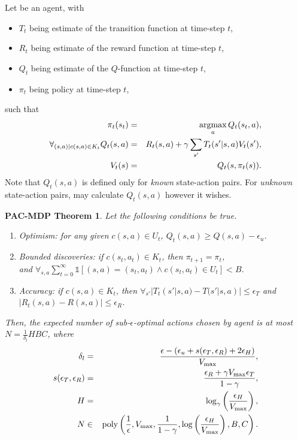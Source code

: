 \begin{defn}
Let \A be an agent, with
\begin{itemize}
\item
$T_t$ being \As estimate of the transition function at time-step $t$,
\item
$R_t$ being \As estimate of the reward function at time-step $t$,
\item
$Q_t$ being \As estimate of the $Q$-function at time-step $t$,
\item
$\pi_t$ being \As policy at time-step $t$, 
\end{itemize}
such that
\begin{eqnarray}
\pi_t(s_t) &=& \argmax_a Q_t(s_t,a),\\
\forall_{(s,a) | c(s,a)\in K_t} Q_t(s,a) &=& R_t(s,a) + \gamma \sum_{s'} T_t(s'|s,a) V_t(s'),\\
V_t(s) &=& Q_t(s,\pi_t(s)).
\end{eqnarray}
Note that $Q_t(s,a)$ is defined only for \emph{known} state-action pairs. For \emph{unknown} state-action pairs, \A may calculate $Q_t(s,a)$ however it wishes.
\end{defn}

\newtheorem*{pacmdpthm}{PAC-MDP Theorem}
\begin{pacmdpthm}
Let the following conditions be true.
\begin{enumerate}
\item
\label{sec:pacmdp:cond:opt}
Optimism: for any given $c(s,a) \in U_t$, $Q_t(s,a) \geq Q(s,a) - \epsilon_u$.
\item
\label{sec:pacmdp:cond:bounded}
Bounded discoveries: if $c(s_t, a_t) \in K_t$, then $\pi_{t+1} = \pi_{t}$,\\ and $\forall_{s,a} \sum_{t=0}^\infty \mathbb{1}\left[(s,a) = (s_t,a_t) \wedge c(s_t,a_t) \in U_t\right] < B$.
\item
\label{sec:pacmdp:cond:acc}
Accuracy: if $c(s,a) \in K_t$, then $\forall_{s'}|T_t(s'|s,a)-T(s'|s,a)| \leq \epsilon_T$ and $|R_t(s,a)-R(s,a)|\leq\epsilon_R$.
\end{enumerate}
Then, the expected number of sub-$\epsilon$-optimal actions chosen by agent \A is at most $N = \frac 1 {\delta_l} H B C$, where
\begin{eqnarray}
\delta_l &=& \frac {\epsilon - (\epsilon_u + s(\epsilon_T,\epsilon_R) +2 \epsilon_H)} {V_{\rm max}},\\
s(\epsilon_T,\epsilon_R) &=& \frac {\epsilon_R + \gamma V_{\rm max} \epsilon_T} {1-\gamma},\\
H&=&\log_\gamma\left(\frac {\epsilon_H}{V_{\rm max}}\right),\\
N&\in&\mbox{poly}\left(\frac 1 \epsilon, V_{\rm max}, \frac{1}{1-\gamma},\log\left(\frac {\epsilon_H}{V_{\rm max}}\right), B, C\right).
\end{eqnarray}
\end{pacmdpthm}

